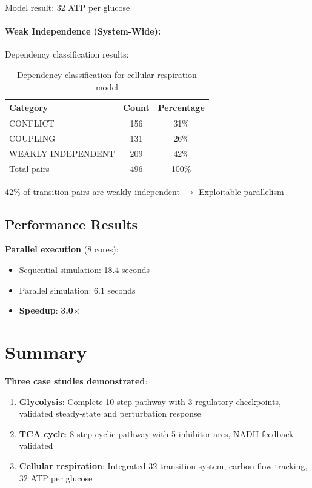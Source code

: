 Model result: 32 ATP per glucose \checkmark

\paragraph{Weak Independence (System-Wide):}

Dependency classification results:

\begin{table}[h]
\centering
\begin{tabular}{@{}lcc@{}}
\toprule
\textbf{Category} & \textbf{Count} & \textbf{Percentage} \\
\midrule
CONFLICT & 156 & 31\% \\
COUPLING & 131 & 26\% \\
WEAKLY INDEPENDENT & 209 & 42\% \\
\midrule
Total pairs & 496 & 100\% \\
\bottomrule
\end{tabular}
\caption{Dependency classification for cellular respiration model}
\label{tab:dependency-classification}
\end{table}

42\% of transition pairs are weakly independent $\to$ Exploitable parallelism

\subsection{Performance Results}
\label{subsec:respiration-performance}

\textbf{Parallel execution} (8 cores):

\begin{itemize}
    \item Sequential simulation: 18.4 seconds
    \item Parallel simulation: 6.1 seconds
    \item \textbf{Speedup}: \textbf{3.0$\times$} \checkmark
\end{itemize}

\section{Summary}
\label{sec:case-studies-summary}

\textbf{Three case studies demonstrated}:

\begin{enumerate}
    \item \textbf{Glycolysis}: Complete 10-step pathway with 3 regulatory checkpoints, validated steady-state and perturbation response
    \item \textbf{TCA cycle}: 8-step cyclic pathway with 5 inhibitor arcs, NADH feedback validated
    \item \textbf{Cellular respiration}: Integrated 32-transition system, carbon flow tracking, 32 ATP per glucose
\end{enumerate}


